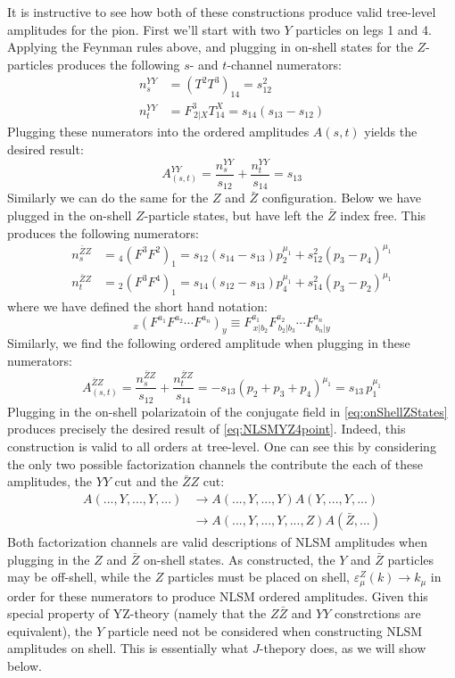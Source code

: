 \documentclass[11pt,letter]{article}
\def\be{\begin{equation}}
\def\ee{\end{equation}}
\begin{document}
It is instructive to see how both of these constructions produce valid tree-level amplitudes for the pion. First we'll start with two $Y$ particles on legs 1 and 4. Applying the Feynman rules above, and plugging in on-shell states for the $Z$-particles produces the following $s$- and $t$-channel numerators:
\begin{align}
n^{YY}_s &= (T^2T^3)_{14} = s_{12}^2 
\\
 n^{YY}_t &=  F^{3}_{\,2|X}T^X_{14}  = s_{14}(s_{13}-s_{12})
\end{align}
Plugging these numerators into the ordered amplitudes $A(s,t)$ yields the desired result:
\be\label{eq:NLSMYZ4point}
A^{YY}_{(s,t)} = \frac{n^{YY}_s}{s_{12}}+\frac{ n^{YY}_t }{s_{14}} = s_{13}
\ee
Similarly we can do the same for the $Z$ and $\bar{Z}$ configuration. Below we have plugged in the on-shell $Z$-particle states, but have left the $\bar{Z}$ index free. This produces the following numerators:
\begin{align}
n^{\bar{Z}Z}_s &= {}_4(F^{3}F^{2})_{1} =  s_{12}(s_{14}-s_{13})p_2^{\mu_1}+s_{12}^2(p_3-p_4)^{\mu_1}
\\
 n^{\bar{Z}Z}_t &=   {}_2(F^{3}F^{4})_{1}  = s_{14}(s_{12}-s_{13})p_4^{\mu_1}+s_{14}^2(p_3-p_2)^{\mu_1}
\end{align}
where we have defined the short hand notation:
\be
{}_x(F^{a_1}F^{a_2}\cdots F^{a_n})_{y} \equiv F^{a_1}_{\,x|b_2}F^{a_2}_{\,b_2|b_3}\cdots F^{a_n}_{\,b_n|y}
\ee
Similarly, we find the following ordered amplitude when plugging in these numerators:
\be
A^{\bar{Z}Z}_{(s,t)} = \frac{n^{\bar{Z}Z}_s}{s_{12}}+\frac{ n^{\bar{Z}Z}_t }{s_{14}} = -s_{13}(p_2+p_3+p_4)^{\mu_1} = s_{13} \,p_1^{\mu_1}
\ee
Plugging in the on-shell polarizatoin of the conjugate field in \cref{eq:onShellZStates} produces precisely the desired result of \cref{eq:NLSMYZ4point}. Indeed, this construction is valid to all orders at tree-level. One can see this by considering the only two possible factorization channels the contribute the each of these amplitudes, the $YY$ cut and the $\bar{Z}Z$ cut:
\begin{align}
A(...,Y,...,Y,...) &\rightarrow A(...,Y,...,Y)A(Y,...,Y,...)
\\
&\rightarrow A(...,Y,...,Y,...,Z)A(\bar{Z},...)
\end{align}
Both factorization channels are valid descriptions of NLSM amplitudes when plugging in the $Z$ and $\bar{Z}$ on-shell states. As constructed, the $Y$ and $\bar{Z}$ particles may be off-shell, while the $Z$ particles must be placed on shell, $\varepsilon^Z_\mu(k)\rightarrow k_\mu$ in order for these numerators to produce NLSM ordered amplitudes. Given this special property of YZ-theory (namely that the $Z\bar{Z}$ and $YY$ constrctions are equivalent), the $Y$ particle need not be considered when constructing NLSM amplitudes on shell. This is essentially what $J$-thepory does, as we will show below.
\end{document}
